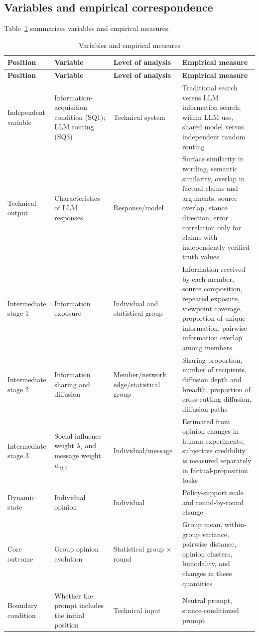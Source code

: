 \documentclass[11pt,a4paper]{article}
\renewcommand{\arraystretch}{1.2}
\begin{document}
\subsection{Variables and empirical correspondence}

Table~\ref{tab:variables} summarizes variables and empirical measures.

\begin{center}
\small
\renewcommand{\arraystretch}{1.18}
\begin{longtable}{@{}>{\RaggedRight\arraybackslash}p{}>{\RaggedRight\arraybackslash}p{}>{\RaggedRight\arraybackslash}p{}>{\RaggedRight\arraybackslash}p{}@{}}
\caption{Variables and empirical measures}\label{tab:variables}\\
\toprule
\textbf{Position} & \textbf{Variable} & \textbf{Level of analysis} & \textbf{Empirical measure} \\
\midrule
\endfirsthead
\toprule
\textbf{Position} & \textbf{Variable} & \textbf{Level of analysis} & \textbf{Empirical measure} \\
\midrule
\endhead
Independent variable & Information-acquisition condition (SQ1); LLM routing (SQ3) & Technical system & Traditional search versus LLM information search; within LLM use, shared model versus independent random routing \\
Technical output & Characteristics of LLM responses & Response/model & Surface similarity in wording, semantic similarity, overlap in factual claims and arguments, source overlap, stance direction; error correlation only for claims with independently verified truth values \\
Intermediate stage 1 & Information exposure & Individual and statistical group & Information received by each member, source composition, repeated exposure, viewpoint coverage, proportion of unique information, pairwise information overlap among members \\
Intermediate stage 2 & Information sharing and diffusion & Member/network edge/statistical group & Sharing proportion, number of recipients, diffusion depth and breadth, proportion of cross-cutting diffusion, diffusion paths \\
Intermediate stage 3 & Social-influence weight $\lambda_i$ and message weight $w_{ij,t}$ & Individual/message & Estimated from opinion changes in human experiments; subjective credibility is measured separately in factual-proposition tasks \\
Dynamic state & Individual opinion & Individual & Policy-support scale and round-by-round change \\
Core outcome & Group opinion evolution & Statistical group $\times$ round & Group mean, within-group variance, pairwise distance, opinion clusters, bimodality, and changes in these quantities \\
Boundary condition & Whether the prompt includes the initial position & Technical input & Neutral prompt, stance-conditioned prompt \\
\bottomrule
\end{longtable}
\end{center}
\end{document}
